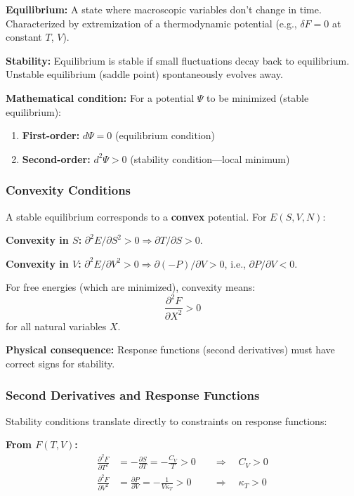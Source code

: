 \documentclass[9pt,twocoloumn]{article}
\begin{document}
\textbf{Equilibrium:} A state where macroscopic variables don't change in time. Characterized by extremization of a thermodynamic potential (e.g., $\delta F = 0$ at constant $T$, $V$).

\textbf{Stability:} Equilibrium is stable if small fluctuations decay back to equilibrium. Unstable equilibrium (saddle point) spontaneously evolves away.

\textbf{Mathematical condition:} For a potential $\Psi$ to be minimized (stable equilibrium):
\begin{enumerate}
    \item \textbf{First-order:} $d\Psi = 0$ (equilibrium condition)
    \item \textbf{Second-order:} $d^2\Psi > 0$ (stability condition—local minimum)
\end{enumerate}

\subsubsection{Convexity Conditions}

A stable equilibrium corresponds to a \textbf{convex} potential. For $E(S, V, N)$:

\textbf{Convexity in $S$:} $\partial^2 E / \partial S^2 > 0 \Rightarrow \partial T/\partial S > 0$.

\textbf{Convexity in $V$:} $\partial^2 E / \partial V^2 > 0 \Rightarrow \partial(-P)/\partial V > 0$, i.e., $\partial P/\partial V < 0$.

For free energies (which are minimized), convexity means:
\begin{equation}
\frac{\partial^2 F}{\partial X^2} > 0
\end{equation}
for all natural variables $X$.

\textbf{Physical consequence:} Response functions (second derivatives) must have correct signs for stability.

\subsubsection{Second Derivatives and Response Functions}

Stability conditions translate directly to constraints on response functions:

\textbf{From $F(T, V)$:}
\begin{align}
\frac{\partial^2 F}{\partial T^2} &= -\frac{\partial S}{\partial T} = -\frac{C_V}{T} > 0 \quad &\Rightarrow \quad \boxed{C_V > 0} \\
\frac{\partial^2 F}{\partial V^2} &= \frac{\partial P}{\partial V} = -\frac{1}{V \kappa_T} > 0 \quad &\Rightarrow \quad \boxed{\kappa_T > 0}
\end{align}
\end{document}
